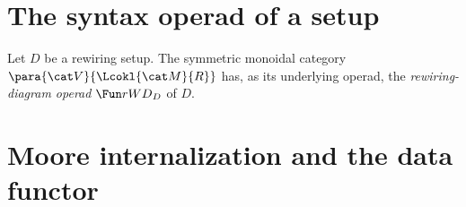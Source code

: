 
\section{The syntax operad of a setup}\label{sec.rwd_syntax}

\begin{definition}[$\rwd_D$]\label{def.rwd}
Let $D$ be a rewiring setup. The symmetric monoidal category
$\para{\cat V}{\Lcokl{\cat M}{R}}$ has, as its underlying operad, the
\emph{rewiring-diagram operad} $\rwd_D$ of $D$.
\end{definition}


\section{Moore internalization and the data functor}\label{sec.data_functor}

